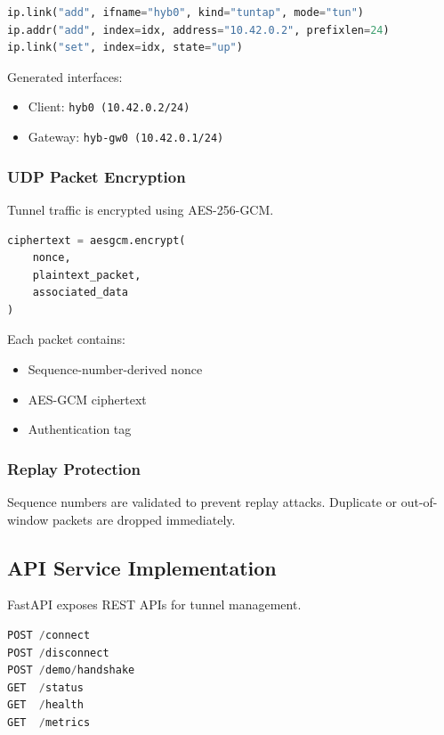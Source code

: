 \begin{lstlisting}[language=Python, caption={TUN Interface Creation}]
ip.link("add", ifname="hyb0", kind="tuntap", mode="tun")
ip.addr("add", index=idx, address="10.42.0.2", prefixlen=24)
ip.link("set", index=idx, state="up")
\end{lstlisting}

Generated interfaces:

\begin{itemize}
    \item Client: \texttt{hyb0 (10.42.0.2/24)}
    \item Gateway: \texttt{hyb-gw0 (10.42.0.1/24)}
\end{itemize}

\subsubsection{UDP Packet Encryption}

Tunnel traffic is encrypted using AES-256-GCM.

\begin{lstlisting}[language=Python, caption={Packet Encryption}]
ciphertext = aesgcm.encrypt(
    nonce,
    plaintext_packet,
    associated_data
)
\end{lstlisting}

Each packet contains:

\begin{itemize}
    \item Sequence-number-derived nonce
    \item AES-GCM ciphertext
    \item Authentication tag
\end{itemize}

\subsubsection{Replay Protection}

Sequence numbers are validated to prevent replay attacks. Duplicate or out-of-window packets are dropped immediately.

\subsection{API Service Implementation}
\label{subsec:api_services}

FastAPI exposes REST APIs for tunnel management.

\begin{lstlisting}[language=Python, caption={FastAPI Endpoints}]
POST /connect
POST /disconnect
POST /demo/handshake
GET  /status
GET  /health
GET  /metrics
\end{lstlisting}

